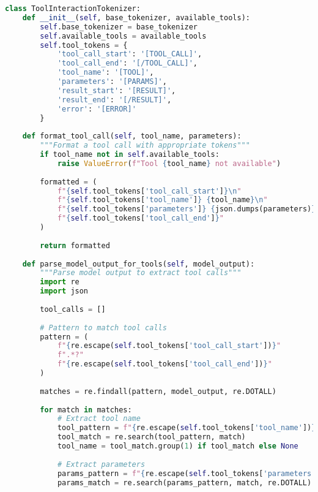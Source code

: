 \begin{lstlisting}[language=Python, caption=Basic tool invocation token system]
class ToolInteractionTokenizer:
    def __init__(self, base_tokenizer, available_tools):
        self.base_tokenizer = base_tokenizer
        self.available_tools = available_tools
        self.tool_tokens = {
            'tool_call_start': '[TOOL_CALL]',
            'tool_call_end': '[/TOOL_CALL]',
            'tool_name': '[TOOL]',
            'parameters': '[PARAMS]',
            'result_start': '[RESULT]',
            'result_end': '[/RESULT]',
            'error': '[ERROR]'
        }
        
    def format_tool_call(self, tool_name, parameters):
        """Format a tool call with appropriate tokens"""
        if tool_name not in self.available_tools:
            raise ValueError(f"Tool {tool_name} not available")
        
        formatted = (
            f"{self.tool_tokens['tool_call_start']}\n"
            f"{self.tool_tokens['tool_name']} {tool_name}\n"
            f"{self.tool_tokens['parameters']} {json.dumps(parameters)}\n"
            f"{self.tool_tokens['tool_call_end']}"
        )
        
        return formatted
    
    def parse_model_output_for_tools(self, model_output):
        """Parse model output to extract tool calls"""
        import re
        import json
        
        tool_calls = []
        
        # Pattern to match tool calls
        pattern = (
            f"{re.escape(self.tool_tokens['tool_call_start'])}"
            f".*?"
            f"{re.escape(self.tool_tokens['tool_call_end'])}"
        )
        
        matches = re.findall(pattern, model_output, re.DOTALL)
        
        for match in matches:
            # Extract tool name
            tool_pattern = f"{re.escape(self.tool_tokens['tool_name'])}\\s+(\\w+)"
            tool_match = re.search(tool_pattern, match)
            tool_name = tool_match.group(1) if tool_match else None
            
            # Extract parameters
            params_pattern = f"{re.escape(self.tool_tokens['parameters'])}\\s+(\\{{.*?\\}})"
            params_match = re.search(params_pattern, match, re.DOTALL)
            

\end{lstlisting}

